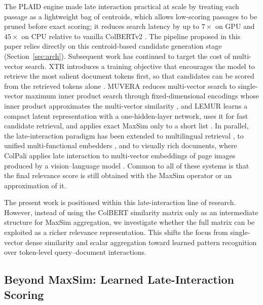 \documentclass[preprint,5p,times,twocolumn,authoryear]{elsarticle}
\begin{document}
The PLAID engine made late interaction practical at scale by treating each passage as a lightweight bag of centroids, which allows low-scoring passages to be pruned before exact scoring; it reduces search latency by up to $7\times$ on GPU and $45\times$ on CPU relative to vanilla ColBERTv2 \citep{santhanam2022plaid}. The pipeline proposed in this paper relies directly on this centroid-based candidate generation stage (Section~\ref{sec:arch}). Subsequent work has continued to target the cost of multi-vector search. XTR introduces a training objective that encourages the model to retrieve the most salient document tokens first, so that candidates can be scored from the retrieved tokens alone \citep{lee2023xtr}. MUVERA reduces multi-vector search to single-vector maximum inner product search through fixed-dimensional encodings whose inner product approximates the multi-vector similarity \citep{dhulipala2024muvera}, and LEMUR learns a compact latent representation with a one-hidden-layer network, uses it for fast candidate retrieval, and applies exact MaxSim only to a short list \citep{jaasaari2026lemur}. In parallel, the late-interaction paradigm has been extended to multilingual retrieval \citep{jha2024jinacolbert}, to unified multi-functional embedders \citep{chen2024m3}, and to visually rich documents, where ColPali applies late interaction to multi-vector embeddings of page images produced by a vision--language model \citep{faysse2025colpali}. Common to all of these systems is that the final relevance score is still obtained with the MaxSim operator or an approximation of it.

The present work is positioned within this late-interaction line of research. However, instead of using the ColBERT similarity matrix only as an intermediate structure for MaxSim aggregation, we investigate whether the full matrix can be exploited as a richer relevance representation. This shifts the focus from single-vector dense similarity and scalar aggregation toward learned pattern recognition over token-level query--document interactions.

\subsection{Beyond MaxSim: Learned Late-Interaction Scoring}
\end{document}
